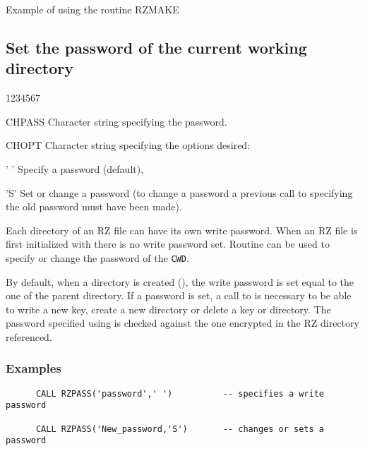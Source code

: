 \begin{XMPt}{Example of using the routine RZMAKE}
\subsection{Set the password of the current working directory}
\Idesc
\begin{DLtt}{1234567}
\item[CHPASS]Character string specifying the password.
\item[CHOPT]Character string specifying the options desired:
\begin{DLtt}{12}
\item[' ']Specify a password (default),
\item['S']Set or change a password (to change a password a previous call to
 specifying the old password must have been made).
\end{DLtt}
\end{DLtt}
\par 
Each directory of an RZ file can have its own write password.
When an RZ file is first initialized with  there is
no write password set.
Routine  can be used to specify
or change the password of the {\tt CWD}.
\par By default, when a directory is created (), the write
password is set equal to the one of the parent directory.
If a password is set, a call to  is necessary to be able
to write a new key, create a new directory or delete a key or directory.
The password specified using  is
checked against the one encrypted in the RZ directory referenced.
\subsubsection{Examples}
\begin{verbatim}
      CALL RZPASS('password',' ')          -- specifies a write password
 
      CALL RZPASS('New_password,'S')       -- changes or sets a password
\end{verbatim}

\end{XMPt}

